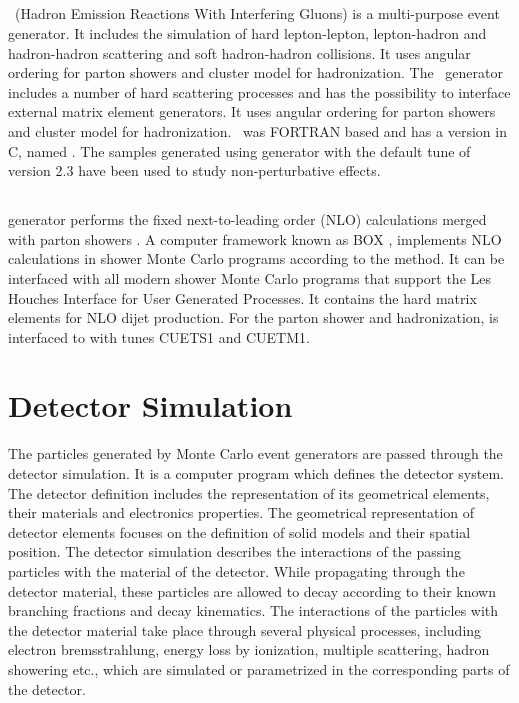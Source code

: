 \subsection{\HERWIG}
\HERWIG~(Hadron Emission Reactions With Interfering Gluons) \cite{Corcella:2000bw} is a multi-purpose event generator. It includes the simulation of hard lepton-lepton, lepton-hadron and hadron-hadron scattering and soft hadron-hadron collisions. It uses angular ordering for parton showers and cluster model for hadronization. The \HERWIG~generator includes a number of hard scattering processes and has the possibility to interface external matrix element generators. It uses angular ordering for parton showers and cluster model for hadronization. \HERWIG~was FORTRAN based and has a version in C\plusn\plusn, named \HERWIGPP \cite{Bahr:2008pv}. The samples generated using \HERWIGPP generator with the default tune of version 2.3 \cite{Bahr:2008tf} have been used to study non-perturbative effects. 

\subsection{\POWHEG}
\POWHEG generator performs the fixed next-to-leading order (NLO) calculations merged with parton showers \cite{Frixione:2007vw, Nason:2004rx, Alioli:2010xa}. A computer framework known as \POWHEG BOX \cite{Oleari:2010nx}, implements NLO calculations in shower Monte Carlo programs according to the \POWHEG method. It can be interfaced with all modern shower Monte Carlo programs that support the Les Houches Interface for User Generated Processes. It contains the hard matrix elements for NLO dijet production. For the parton shower and hadronization, \POWHEG is interfaced to \PYTHIAE with tunes CUETS1 and CUETM1.

\section{Detector Simulation}
The particles generated by Monte Carlo event generators are passed through the detector simulation. It is a computer program which defines the detector system. The detector definition includes the representation of its geometrical elements, their materials and electronics properties. The geometrical representation of detector elements focuses on the definition of solid models and their spatial position. The detector simulation describes the interactions of the passing particles with the material of the detector. While propagating through the detector material, these particles are allowed to decay according to their known branching fractions and decay kinematics. The interactions of the particles with the detector material take place through several physical processes, including electron bremsstrahlung, energy loss by ionization, multiple scattering, hadron showering etc., which are simulated or parametrized in the corresponding parts of the detector. 

